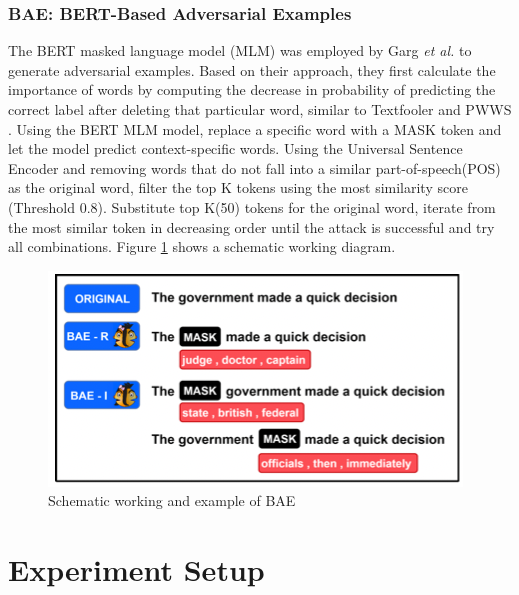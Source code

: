 \documentclass[%
	BCOR=8mm, %
	DIV=12,
	toc=bibliography, %
	toc=listof, %
	oneside, %
	egregdoesnotlikesansseriftitles, %
	]{scrbook}
\begin{document}
\subsection{BAE: BERT-Based Adversarial Examples}
\label{subsection:bae}
The BERT masked language model (MLM) was employed by Garg \textit{et al.} \cite{garg_bae_2020}  to generate adversarial examples. Based on their approach, they first calculate the importance of words by computing the decrease in probability of predicting the correct label after deleting that particular word, similar to Textfooler \cite{jia_certified_2019}  and PWWS \cite{ren_generating_2019}. Using the BERT MLM model, replace a specific word with a MASK token and let the model predict context-specific words. Using the Universal Sentence Encoder \cite{cer_universal_2018} and removing words that do not fall into a similar part-of-speech(POS) as the original word, filter the top K tokens using the most similarity score (Threshold 0.8). Substitute top K(50) tokens for the original word, iterate from the most similar token in decreasing order until the attack is successful and try all combinations. Figure \ref{diag:baeexp} shows a schematic working diagram.
\begin{figure}[H]
    \centering
    \includegraphics[width=.5\textwidth]{img/BAEexample.png}
    \caption[Schematic working and example of BAE attack recipe]{Schematic working and example of BAE\cite{garg_bae_2020} }
    \label{diag:baeexp}
\end{figure}
 
\chapter{Experiment Setup}
\label{chapter:experiment}
\end{document}
